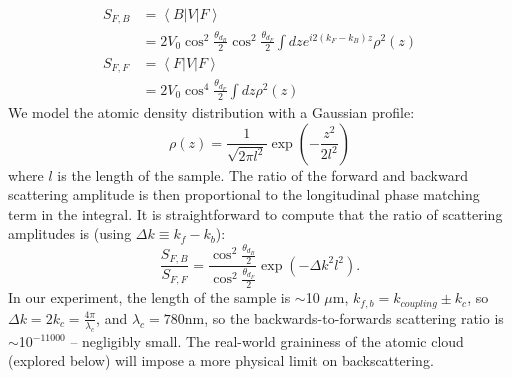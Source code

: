 \documentclass[aps,pra,twocolumn,groupedaddress,10pt,showpacs]{revtex4-1}
\begin{document}
\begin{equation}
\begin{aligned}
S_{F,B} &= \left< B \right| V \left| F \right> \\
&= 2 V_{0} \cos^2{\frac{\theta_{d_B}}{2}} \cos^2{\frac{\theta_{d_F}}{2}}
\int dz e^{i2(k_{F}-k_{B})z} \rho^2(z) \\
S_{F,F} &= \left< F \right| V \left| F \right> \\
&= 2 V_{0} \cos^4{\frac{\theta_{d_F}}{2}}
\int dz \rho^2(z)
\end{aligned}
\end{equation}
We model the atomic density distribution with a Gaussian profile:
\begin{equation}
\rho(z) = \frac{1}{\sqrt{2\pi l^2}}\exp{(-\frac{z^{2}}{2 l^{2}})}
\end{equation}
where $l$ is the length of the sample. The ratio of the forward and backward scattering amplitude is then proportional to the longitudinal phase matching term in the integral. It is straightforward to compute that the ratio of scattering amplitudes is (using $\Delta k\equiv k_f-k_b$):
\begin{equation}
\frac{S_{F,B}}{S_{F,F}} = \frac{\cos^2{\frac{\theta_{d_B}}{2}}}{\cos^2{\frac{\theta_{d_F}}{2}}}\exp(-{\Delta k}^2 l^2).
\end{equation}
In our experiment, the length of the sample is $\sim$10 $\mu$m, $k_{f,b}=k_{coupling}\pm k_c$, so $\Delta k=2 k_c=\frac{4\pi}{\lambda_c}$, and $\lambda_c=780$nm, so the backwards-to-forwards scattering ratio is $\sim$10$^{-11000}$ -- negligibly small. The real-world graininess of the atomic cloud (explored below) will impose a more physical limit on backscattering.
\end{document}
